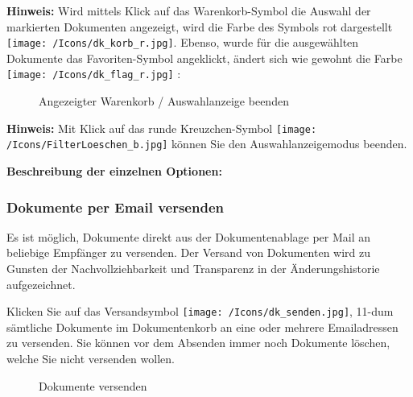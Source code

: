 \vspace{\baselineskip}

\textbf{Hinweis:} Wird mittels Klick auf das Warenkorb-Symbol die Auswahl der markierten Dokumenten angezeigt, wird die Farbe des Symbols rot dargestellt \texttt{[image: /Icons/dk\_korb\_r.jpg]}. Ebenso, wurde für die ausgewählten Dokumente das Favoriten-Symbol angeklickt, ändert sich wie gewohnt die Farbe \texttt{[image: /Icons/dk\_flag\_r.jpg]} :

\begin{figure}[H]
\caption{Angezeigter Warenkorb / Auswahlanzeige beenden}
\end{figure}

\textbf{Hinweis:} Mit Klick auf das runde Kreuzchen-Symbol \texttt{[image: /Icons/FilterLoeschen\_b.jpg]}  können Sie den Auswahlanzeigemodus beenden. 

\vspace{\baselineskip}

\textbf{Beschreibung der einzelnen Optionen:}

\subsubsection{Dokumente per Email versenden}
\label{bkm:Ref201701127}

Es ist möglich, Dokumente direkt aus der Dokumentenablage per Mail an beliebige Empfänger zu versenden. Der Versand von Dokumenten wird zu Gunsten der Nachvollziehbarkeit und Transparenz in der Änderungshistorie aufgezeichnet.

Klicken Sie auf das Versandsymbol \texttt{[image: /Icons/dk\_senden.jpg]}, 11-dum sämtliche Dokumente im Dokumentenkorb an eine oder mehrere Emailadressen zu versenden. Sie können vor dem Absenden immer noch Dokumente löschen, welche Sie nicht versenden wollen.

\begin{figure}[H]
\caption{Dokumente versenden}
\end{figure}

